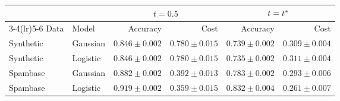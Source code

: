 \begin{tabular}{llrrrr}
\toprule
 & & \multicolumn{2}{c}{$t=0.5$} & \multicolumn{2}{c}{$t=t^{\ast}$}\\
\cmidrule(lr){3-4}\cmidrule(lr){5-6}
Data & Model & Accuracy & Cost & Accuracy & Cost\\
\midrule
Synthetic & Gaussian & \(0.846\pm0.002\) & \(0.780\pm0.015\) & \(0.739\pm0.002\) & \(0.309\pm0.004\)\\
Synthetic & Logistic & \(0.846\pm0.002\) & \(0.780\pm0.015\) & \(0.735\pm0.002\) & \(0.311\pm0.004\)\\
Spambase & Gaussian & \(0.882\pm0.002\) & \(0.392\pm0.013\) & \(0.783\pm0.002\) & \(0.293\pm0.006\)\\
Spambase & Logistic & \(0.919\pm0.002\) & \(0.359\pm0.015\) & \(0.832\pm0.004\) & \(0.261\pm0.007\)\\
\bottomrule
\end{tabular}
